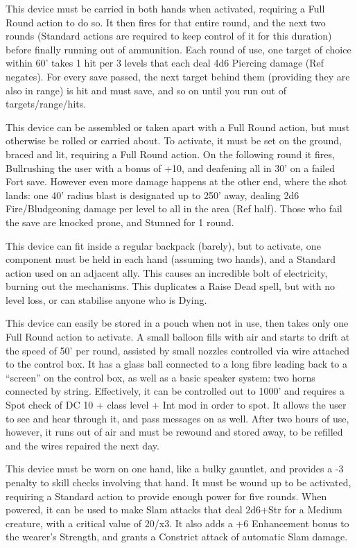 {This device must be carried in both hands when activated, requiring a Full Round action to do so. It then fires for that entire round, and the next two rounds (Standard actions are required to keep control of it for this duration) before finally running out of ammunition. Each round of use, one target of choice within 60' takes 1 hit per 3 levels that each deal 4d6 Piercing damage (Ref negates). For every save passed, the next target behind them (providing they are also in range) is hit and must save, and so on until you run out of targets/range/hits.}

{This device can be assembled or taken apart with a Full Round action, but must otherwise be rolled or carried about. To activate, it must be set on the ground, braced and lit, requiring a Full Round action. On the following round it fires, Bullrushing the user with a bonus of +10, and deafening all in 30' on a failed Fort save. However even more damage happens at the other end, where the shot lands: one 40' radius blast is designated up to 250' away, dealing 2d6 Fire/Bludgeoning damage per level to all in the area (Ref half). Those who fail the save are knocked prone, and Stunned for 1 round.}

{This device can fit inside a regular backpack (barely), but to activate, one component must be held in each hand (assuming two hands), and a Standard action used on an adjacent ally. This causes an incredible bolt of electricity, burning out the mechanisms. This duplicates a Raise Dead spell, but with no level loss, or can stabilise anyone who is Dying.}

{This device can easily be stored in a pouch when not in use, then takes only one Full Round action to activate. A small balloon fills with air and starts to drift at the speed of 50' per round, assisted by small nozzles controlled via wire attached to the control box. It has a glass ball connected to a long fibre leading back to a ``screen'' on the control box, as well as a basic speaker system: two horns connected by string. Effectively, it can be controlled out to 1000' and requires a Spot check of DC 10 + class level + Int mod in order to spot. It allows the user to see and hear through it, and pass messages on as well. After two hours of use, however, it runs out of air and must be rewound and stored away, to be refilled and the wires repaired the next day.}

{This device must be worn on one hand, like a bulky gauntlet, and provides a -3 penalty to skill checks involving that hand. It must be wound up to be activated, requiring a Standard action to provide enough power for five rounds. When powered, it can be used to make Slam attacks that deal 2d6+Str for a Medium creature, with a critical value of 20/x3. It also adds a +6 Enhancement bonus to the wearer's Strength, and grants a Constrict attack of automatic Slam damage.}

